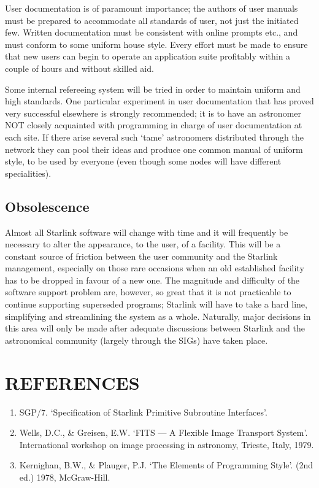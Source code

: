 User documentation is of paramount importance; the authors of user manuals must
be prepared to accommodate all standards of user, not just the initiated few.
Written documentation must be consistent with online prompts etc., and must
conform to some uniform house style.
Every effort must be made to ensure that new users can begin to operate an
application suite profitably within a couple of hours and without skilled aid.

Some internal refereeing system will be tried in order to maintain uniform and
high standards.
One particular experiment in user documentation that has proved very successful
elsewhere is strongly recommended; it is to have an astronomer NOT closely
acquainted with programming in charge of user documentation at each site.
If there arise several such `tame' astronomers distributed through the network
they can pool their ideas and produce one common manual of uniform style, to be
used by everyone (even though some nodes will have different specialities).
\subsection {Obsolescence}
Almost all Starlink software will change with time and it will frequently be
necessary to alter the appearance, to the user, of a facility.
This will be a constant source of friction between the user community and the
Starlink management, especially on those rare occasions when an old established
facility has to be dropped in favour of a new one.
The magnitude and difficulty of the software support problem are, however, so
great that it is not practicable to continue supporting superseded programs;
Starlink will have to take a hard line, simplifying and streamlining the system
as a whole.
Naturally, major decisions in this area will only be made after adequate
discussions between Starlink and the astronomical community (largely through
the SIGs) have taken place.
\section {REFERENCES}
\begin{enumerate}
\item SGP/7. `Specification of Starlink Primitive Subroutine Interfaces'.
\item Wells, D.C., \& Greisen, E.W.  `FITS --- A Flexible Image Transport
System'.
International workshop on image processing in astronomy, Trieste, Italy, 1979.
\item Kernighan, B.W., \& Plauger, P.J.  `The Elements of Programming Style'.
(2nd ed.)  1978, McGraw-Hill.
\end{enumerate}
\appendix
